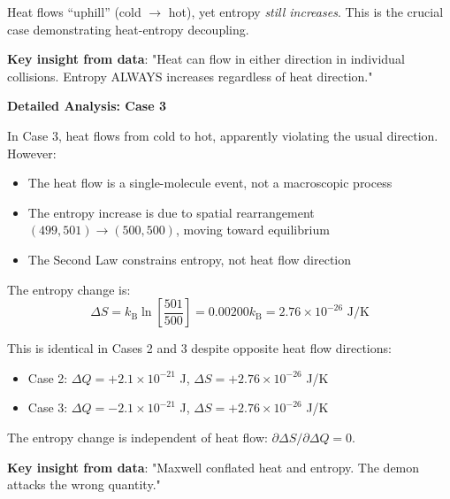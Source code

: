 \documentclass[10pt,twocolumn,letterpaper]{article}
\theoremstyle{definition}
\theoremstyle{remark}
\newcommand{\kb}{k_\text{B}}
\begin{document}
Heat flows ``uphill'' (cold $\to$ hot), yet entropy \textit{still increases}. This is the crucial case demonstrating heat-entropy decoupling.

\textbf{Key insight from data}: "Heat can flow in either direction in individual collisions. Entropy ALWAYS increases regardless of heat direction."

\textbf{Detailed Analysis: Case 3}

In Case 3, heat flows from cold to hot, apparently violating the usual direction. However:
\begin{itemize}
\item The heat flow is a single-molecule event, not a macroscopic process
\item The entropy increase is due to spatial rearrangement $(499, 501) \to (500, 500)$, moving toward equilibrium
\item The Second Law constrains entropy, not heat flow direction
\end{itemize}

The entropy change is:
\begin{equation}
\Delta S = \kb \ln\left[\frac{501}{500}\right] = 0.00200 \kb = 2.76 \times 10^{-26} \text{ J/K}
\end{equation}

This is identical in Cases 2 and 3 despite opposite heat flow directions:
\begin{itemize}
\item Case 2: $\Delta Q = +2.1 \times 10^{-21}$ J, $\Delta S = +2.76 \times 10^{-26}$ J/K
\item Case 3: $\Delta Q = -2.1 \times 10^{-21}$ J, $\Delta S = +2.76 \times 10^{-26}$ J/K
\end{itemize}

The entropy change is independent of heat flow: $\partial \Delta S/\partial \Delta Q = 0$.

\textbf{Key insight from data}: "Maxwell conflated heat and entropy. The demon attacks the wrong quantity."
\end{document}
